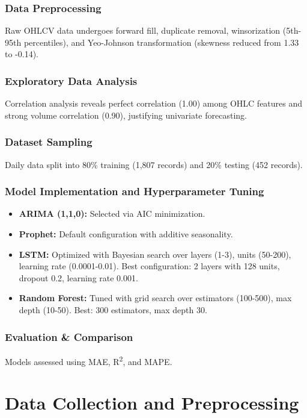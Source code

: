 \documentclass[conference]{IEEEtran}
\begin{document}
\subsubsection{Data Preprocessing}
Raw OHLCV data undergoes forward fill, duplicate removal, winsorization (5th-95th percentiles), and Yeo-Johnson transformation (skewness reduced from 1.33 to -0.14).

\subsubsection{Exploratory Data Analysis}
Correlation analysis reveals perfect correlation (1.00) among OHLC features and strong volume correlation (0.90), justifying univariate forecasting.

\subsubsection{Dataset Sampling}
Daily data split into 80\% training (1,807 records) and 20\% testing (452 records).

\subsubsection{Model Implementation and Hyperparameter Tuning}
\begin{itemize}
    \item \textbf{ARIMA (1,1,0):} Selected via AIC minimization.
    \item \textbf{Prophet:} Default configuration with additive seasonality.
    \item \textbf{LSTM:} Optimized with Bayesian search over layers (1-3), units (50-200), learning rate (0.0001-0.01). Best configuration: 2 layers with 128 units, dropout 0.2, learning rate 0.001.
    \item \textbf{Random Forest:} Tuned with grid search over estimators (100-500), max depth (10-50). Best: 300 estimators, max depth 30.
\end{itemize}

\subsubsection{Evaluation \& Comparison}
Models assessed using MAE, R\textsuperscript{2}, and MAPE.


\section{Data Collection and Preprocessing}
\end{document}
